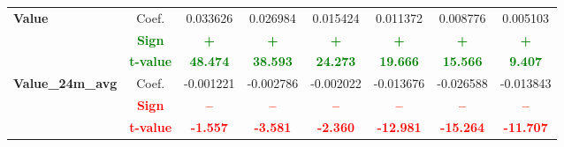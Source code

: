 \documentclass[11pt,english,a4paper,hidelinks]{book}
\begin{document}
\begin{table}[H]
\begin{tabular}{lccccccc}
        \midrule
        \multirow{3}{*}{\textbf{Value}}
            & Coef.   & 0.033626  & 0.026984  & 0.015424  & 0.011372  & 0.008776  & 0.005103  \\
            & \textbf{\textcolor{green}{Sign}}    & \textbf{\textcolor{green}{+}}        & \textbf{\textcolor{green}{+}}        & \textbf{\textcolor{green}{+}}        & \textbf{\textcolor{green}{+}}        & \textbf{\textcolor{green}{+}}        & \textbf{\textcolor{green}{+}}        \\
            & \textbf{\textcolor{green}{t-value}} & \textbf{\textcolor{green}{48.474}}    & \textbf{\textcolor{green}{38.593}}    & \textbf{\textcolor{green}{24.273}}    & \textbf{\textcolor{green}{19.666}}    & \textbf{\textcolor{green}{15.566}}    & \textbf{\textcolor{green}{9.407}}    \\
        \midrule
        \multirow{3}{*}{\textbf{Value\_24m\_avg}} 
            & Coef.   & -0.001221 & -0.002786 & -0.002022 & -0.013676 & -0.026588 & -0.013843 \\
            & \textbf{\textcolor{red}{Sign}}    & \textbf{\textcolor{red}{–}}         & \textbf{\textcolor{red}{–}}         & \textbf{\textcolor{red}{–}}         & \textbf{\textcolor{red}{–}}         & \textbf{\textcolor{red}{–}}         & \textbf{\textcolor{red}{–}}         \\
            & \textbf{\textcolor{red}{t-value}} & \textbf{\textcolor{red}{-1.557}}    & \textbf{\textcolor{red}{-3.581}}    & \textbf{\textcolor{red}{-2.360}}    & \textbf{\textcolor{red}{-12.981}}   & \textbf{\textcolor{red}{-15.264}}   & \textbf{\textcolor{red}{-11.707}}   \\
        \bottomrule
    \end{tabular}
    \label{tab:south_america_windowed_consistency_summary}
\end{table}
\end{document}
